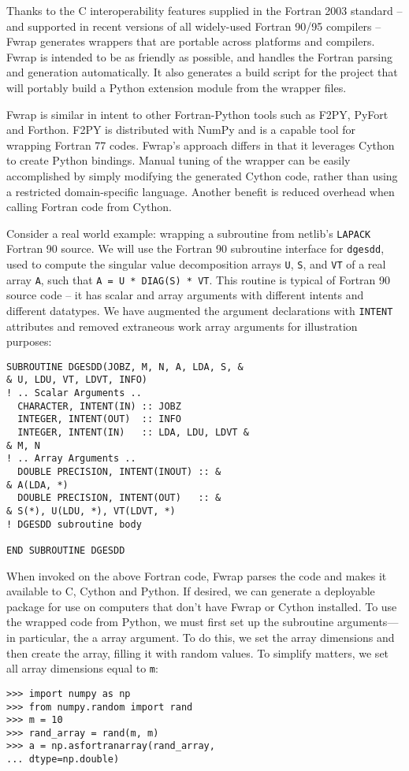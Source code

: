 \documentclass[letterpaper,11pt,english]{article}
\newcommand{\code}[1]{\texttt{#1}}
\begin{document}
Thanks to the C interoperability features supplied in the Fortran 2003
standard -- and supported in recent versions of all widely-used
Fortran 90/95 compilers -- Fwrap generates wrappers that are portable
across platforms and compilers.  Fwrap is intended to be as friendly
as possible, and handles the Fortran parsing and generation
automatically.  It also generates a build script for the project that
will portably build a Python extension module from the wrapper files.

Fwrap is similar in intent to other Fortran-Python tools such as F2PY,
PyFort and Forthon.  F2PY is distributed with NumPy and is a capable
tool for wrapping Fortran 77 codes.
Fwrap's approach differs in that it leverages Cython to
create Python bindings. Manual tuning of the wrapper can be easily
accomplished by simply modifying the generated Cython code, rather
than using a restricted domain-specific language. Another benefit
is reduced overhead when calling Fortran code from Cython.

Consider a real world example: wrapping a subroutine from netlib's
\code{LAPACK} Fortran 90 source.  We will use the Fortran 90 subroutine
interface for \code{dgesdd}, used to compute the singular value
decomposition arrays \code{U}, \code{S}, and \code{VT} of a real array \code{A},
such that \code{A = U * DIAG(S) * VT}.  This routine is typical of Fortran 90
source code -- it has scalar and array arguments with different
intents and different datatypes. We have augmented the argument
declarations with \code{INTENT} attributes and removed extraneous work
array arguments for illustration purposes:

\begin{verbatim}
SUBROUTINE DGESDD(JOBZ, M, N, A, LDA, S, &
& U, LDU, VT, LDVT, INFO)
! .. Scalar Arguments ..
  CHARACTER, INTENT(IN) :: JOBZ
  INTEGER, INTENT(OUT)  :: INFO
  INTEGER, INTENT(IN)   :: LDA, LDU, LDVT &
& M, N
! .. Array Arguments ..
  DOUBLE PRECISION, INTENT(INOUT) :: &
& A(LDA, *)
  DOUBLE PRECISION, INTENT(OUT)   :: &
& S(*), U(LDU, *), VT(LDVT, *)
! DGESDD subroutine body

END SUBROUTINE DGESDD
\end{verbatim}


When invoked on the above Fortran code, Fwrap parses the code and
makes it available to C, Cython and Python. If desired, we can
generate a deployable package for use on computers that don't have
Fwrap or Cython installed. To use the wrapped code from Python,
we must first set up the subroutine arguments—in particular, the a
array argument. To do this, we set the array dimensions and then
create the array, filling it with random values. To simplify
matters, we set all array dimensions equal to \code{m}:
\begin{verbatim}
>>> import numpy as np
>>> from numpy.random import rand
>>> m = 10
>>> rand_array = rand(m, m)
>>> a = np.asfortranarray(rand_array,
... dtype=np.double)
\end{verbatim}
\end{document}
